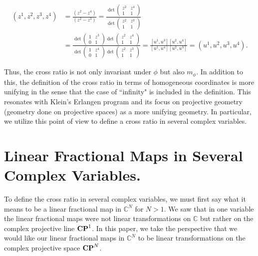 \documentclass{amsart}
\theoremstyle{theorem}
\theoremstyle{lemma}
\theoremstyle{definition}
\begin{document}
\begin{align*}(z^1, z^2, z^3, z^4)&=\frac{(z^2-z^4)}{(z^2-z^3)}=\frac{\det \begin{pmatrix}
z^2 & z^4\\ 
1 & 1 
\end{pmatrix}}{\det \begin{pmatrix}
z^2 & z^3 \\ 
1 & 1 
\end{pmatrix}}\\
&=\frac{\det \begin{pmatrix}
1 & z^3\\ 
0 & 1 
\end{pmatrix}\det \begin{pmatrix}
z^2 & z^4\\ 
1 & 1 
\end{pmatrix}}{\det \begin{pmatrix}
1 & z^4\\ 
0 & 1 
\end{pmatrix}\det \begin{pmatrix}
z^2 & z^3 \\ 
1 & 1 
\end{pmatrix}}=\frac{[u^1,u^3][u^2,u^4]}{[u^1,u^4][u^2,u^3]}=(u^1, u^2,u^3,u^4).
\end{align*}

Thus, the cross ratio is not only invariant under $\phi$  but also $m_{\phi}$. In addition to this, the definition of the cross ratio in terms of homogeneous coordinates is more unifying in the sense that the case of ``infinity" is included in the definition. This resonates with Klein's Erlangen program and its focus on projective geometry (geometry done on projective spaces) as a more unifying geometry. In particular, we utilize this point of view to define a cross ratio in several complex variables.

\section{Linear Fractional Maps in Several Complex Variables.}

To define the cross ratio in several complex variables, we must first say what it means to be a linear fractional map in $\mathbb{C}^N$ for $N>1$. We saw that in one variable the linear fractional maps were not linear transformations on $\mathbb{C}$ but rather on the complex projective line ${\bf CP}^1$. In this paper, we take the perspective that we would like our linear fractional maps in $\mathbb{C}^N$ to be linear transformations on the complex projective space ${\bf CP}^N$.
\end{document}
